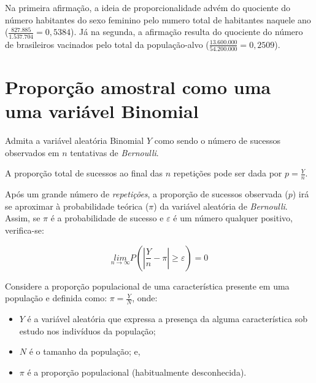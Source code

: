 \documentclass[
]{book}
\providecommand{\tightlist}{%
  \setlength{\itemsep}{0pt}\setlength{\parskip}{0pt}}
\begin{document}
Na primeira afirmação, a ideia de proporcionalidade advém do quociente do número habitantes do sexo feminino pelo numero total de habitantes naquele ano (\(\frac{827.885}{1.537.704}=0,5384\)). Já na segunda, a afirmação resulta do quociente do número de brasileiros vacinados pelo total da população-alvo (\(\frac{13.600.000}{54.200.000}=0,2509\)).

\hfill\break

\hypertarget{proporuxe7uxe3o-amostral-como-uma-uma-variuxe1vel-binomial}{%
\section{Proporção amostral como uma uma variável Binomial}\label{proporuxe7uxe3o-amostral-como-uma-uma-variuxe1vel-binomial}}

\hfill\break

Admita a variável aleatória Binomial \(Y\) como sendo o número de sucessos observados em \(n\) tentativas de \emph{Bernoulli}.

\hfill\break

A proporção total de sucessos ao final das \(n\) repetições pode ser dada por \(p=\frac{Y}{n}\).

\hfill\break

Após um grande número de \emph{repetições}, a proporção de sucessos observada (\(p\)) irá se aproximar à probabilidade teórica (\(\pi\)) da variável aleatória de \emph{Bernoulli}. Assim, se \(\pi\) é a probabilidade de sucesso e \(\varepsilon\) é um número qualquer positivo, verifica-se:

\hfill\break

\[
\underset{n\to \infty }{lim}P\left(\left|\frac{Y}{n}-\pi\right|\ge \varepsilon \right)=0
\]

\hfill\break

Considere a proporção populacional de uma característica presente em uma população e definida como: \(\pi=\frac{Y}{N}\), onde:

\hfill\break

\begin{itemize}
\tightlist
\item
  \(Y\) é a variável aleatória que expressa a presença da alguma característica sob estudo nos indivíduos da população;
\item
  \(N\) é o tamanho da população; e,
\item
  \(\pi\) é a proporção populacional (habitualmente desconhecida).
\end{itemize}
\end{document}

